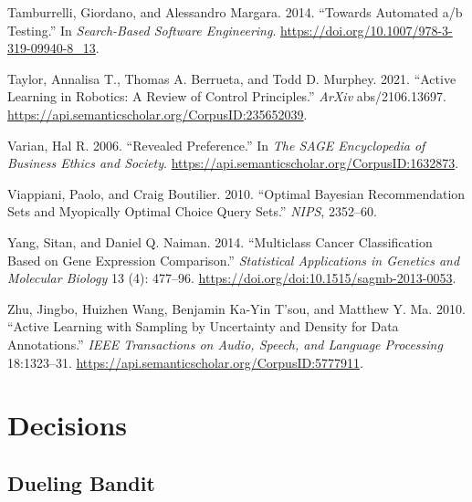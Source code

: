 \documentclass[
  letterpaper,
  numbers=noenddot,
  DIV=11]{scrreprt}
\newlength{\cslhangindent}
\newenvironment{CSLReferences}[2] %
 {\begin{list}{}{%
  \setlength{\itemindent}{0pt}
  \setlength{\leftmargin}{0pt}
  \setlength{\parsep}{0pt}
  \ifodd #1
   \setlength{\leftmargin}{\cslhangindent}
   \setlength{\itemindent}{-1\cslhangindent}
  \fi
  \setlength{\itemsep}{#2\baselineskip}}}
 {\end{list}}
\let\oldchapter\chapter
\def\chapter{%
  \setcounter{sidenote}{1}%
  \oldchapter
}
\theoremstyle{plain}
\theoremstyle{definition}
\theoremstyle{remark}
\begin{document}
\begin{CSLReferences}{1}{0}
Tamburrelli, Giordano, and Alessandro Margara. 2014. {``Towards
Automated a/b Testing.''} In \emph{Search-Based Software Engineering}.
\url{https://doi.org/10.1007/978-3-319-09940-8_13}.

Taylor, Annalisa T., Thomas A. Berrueta, and Todd D. Murphey. 2021.
{``Active Learning in Robotics: A Review of Control Principles.''}
\emph{ArXiv} abs/2106.13697.
\url{https://api.semanticscholar.org/CorpusID:235652039}.

Varian, Hal R. 2006. {``Revealed Preference.''} In \emph{The SAGE
Encyclopedia of Business Ethics and Society}.
\url{https://api.semanticscholar.org/CorpusID:1632873}.

Viappiani, Paolo, and Craig Boutilier. 2010. {``Optimal Bayesian
Recommendation Sets and Myopically Optimal Choice Query Sets.''}
\emph{NIPS}, 2352--60.

Yang, Sitan, and Daniel Q. Naiman. 2014. {``Multiclass Cancer
Classification Based on Gene Expression Comparison.''} \emph{Statistical
Applications in Genetics and Molecular Biology} 13 (4): 477--96.
\url{https://doi.org/doi:10.1515/sagmb-2013-0053}.

Zhu, Jingbo, Huizhen Wang, Benjamin Ka-Yin T'sou, and Matthew Y. Ma.
2010. {``Active Learning with Sampling by Uncertainty and Density for
Data Annotations.''} \emph{IEEE Transactions on Audio, Speech, and
Language Processing} 18:1323--31.
\url{https://api.semanticscholar.org/CorpusID:5777911}.

\end{CSLReferences}


\chapter{Decisions}\label{decisions}

\section{Dueling Bandit}\label{dueling-bandit}
\end{document}
